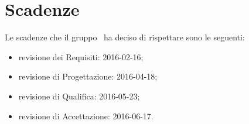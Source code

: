 \documentclass[../PianoProgetto.tex]{subfiles}
\begin{document}
\section{Scadenze}
		Le scadenze che il gruppo \leaf\ ha deciso di rispettare sono le seguenti:
		\begin{itemize}
		\item revisione dei Requisiti: 2016-02-16;
		\item revisione di Progettazione: 2016-04-18;
		\item revisione di Qualifica: 2016-05-23;
		\item revisione di Accettazione: 2016-06-17.
		\end{itemize}
\end{document}
